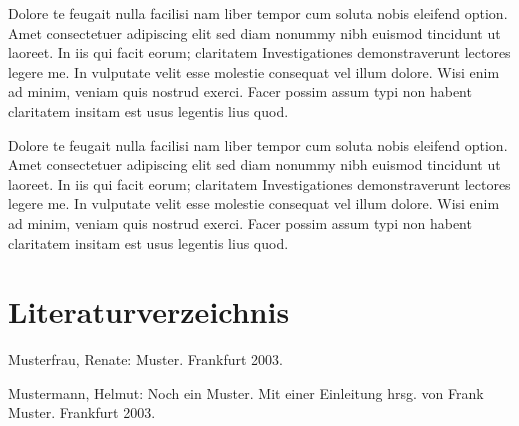 \documentclass[a4paper,12pt]{scrartcl}
\begin{document}
Dolore te feugait nulla facilisi nam liber tempor cum soluta nobis eleifend option. Amet consectetuer adipiscing elit sed diam nonummy nibh euismod tincidunt ut laoreet. In iis qui facit eorum; claritatem Investigationes demonstraverunt lectores legere me. In vulputate velit esse molestie consequat vel illum dolore. Wisi enim ad minim, veniam quis nostrud exerci. Facer possim assum typi non habent claritatem insitam est usus legentis lius quod.

Dolore te feugait nulla facilisi nam liber tempor cum soluta nobis eleifend option. Amet consectetuer adipiscing elit sed diam nonummy nibh euismod tincidunt ut laoreet. In iis qui facit eorum; claritatem Investigationes demonstraverunt lectores legere me. In vulputate velit esse molestie consequat vel illum dolore. Wisi enim ad minim, veniam quis nostrud exerci. Facer possim assum typi non habent claritatem insitam est usus legentis lius quod.

\clearpage

\section{Literaturverzeichnis}

Musterfrau, Renate: Muster. Frankfurt 2003.


Mustermann, Helmut: Noch ein Muster. Mit einer Einleitung hrsg. von Frank Muster. Frankfurt 2003.
\end{document}
